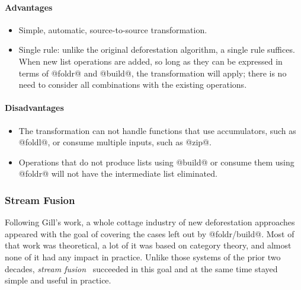 \paragraph{Advantages}
\begin{itemize}
    \item Simple, automatic, source-to-source transformation.


    \item Single rule: unlike the original deforestation algorithm, a single
        rule suffices. When new list operations are added, so long as they can
        be expressed in terms of @foldr@ and @build@, the
        transformation will apply; there is no need to consider all combinations
        with the existing operations.
\end{itemize}

\paragraph{Disadvantages}
\begin{itemize}
    \item The transformation can not handle functions that use accumulators,
        such as @foldl@, or consume multiple inputs, such as @zip@.

    \item Operations that do not produce lists using @build@ or consume them
        using @foldr@ will not have the intermediate list eliminated.
\end{itemize}


\subsubsection{Stream Fusion}

Following Gill's work, a whole cottage industry of new deforestation approaches
appeared with the goal of covering the cases left out by
@foldr/build@. Most of that work was
theoretical, a lot of it was based on category theory, and almost none of it had
any impact in practice. Unlike those systems of the prior two decades,
\emph{stream fusion}~\cite{Coutts:2007kp} succeeded in this
goal and at the same time stayed simple and useful in practice.

